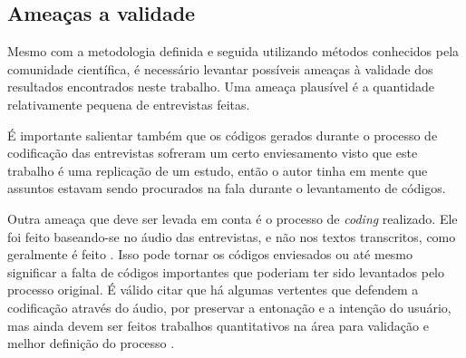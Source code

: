 \subsection{Ameaças a validade}

Mesmo com a metodologia definida e seguida utilizando métodos conhecidos pela comunidade científica, é necessário levantar possíveis ameaças à validade dos resultados encontrados neste trabalho. Uma ameaça plausível é a quantidade relativamente pequena de entrevistas feitas.

É importante salientar também que os códigos gerados durante o processo de codificação das entrevistas sofreram um certo enviesamento visto que este trabalho é uma replicação de um estudo, então o autor tinha em mente que assuntos estavam sendo procurados na fala durante o levantamento de códigos. 

Outra ameaça que deve ser levada em conta é o processo de \emph{coding} realizado. Ele foi feito baseando-se no áudio das entrevistas, e não nos textos transcritos, como geralmente é feito \cite{groundedTheory}. Isso pode tornar os códigos enviesados ou até mesmo significar a falta de códigos importantes que poderiam ter sido levantados pelo processo original. É válido citar que há algumas vertentes que defendem a codificação através do áudio, por preservar a entonação e a intenção do usuário, mas ainda devem ser feitos trabalhos quantitativos na área para validação e melhor definição do processo \cite{listenCode}. 
